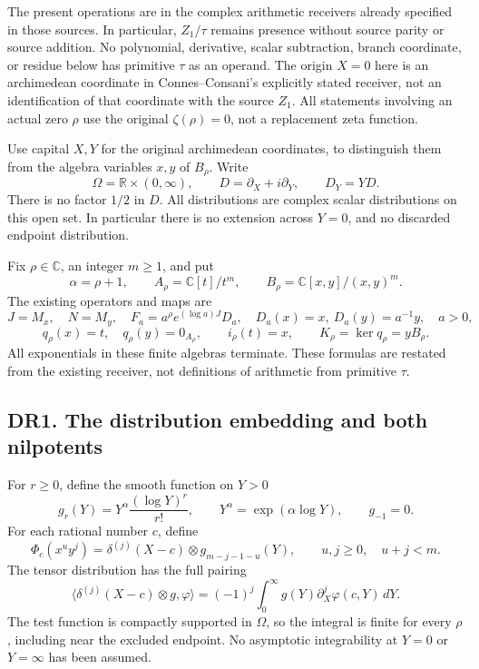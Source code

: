 The present operations are in the complex arithmetic receivers already
specified in those sources. In particular, \(Z_1/\tau\) remains presence
without source parity or source addition. No polynomial, derivative,
scalar subtraction, branch coordinate, or residue below has primitive
\(\tau\) as an operand. The origin \(X=0\) here is an archimedean
coordinate in Connes--Consani's explicitly stated receiver, not an
identification of that coordinate with the source \(Z_1\). All
statements involving an actual zero \(\rho\) use the original
\(\zeta(\rho)=0\), not a replacement zeta function.

Use capital \(X,Y\) for the original archimedean coordinates, to
distinguish them from the algebra variables \(x,y\) of \(B_\rho\). Write
\[
 \Omega=\mathbb R\times(0,\infty),\qquad
 D=\partial_X+i\partial_Y,\qquad D_Y=YD.
\tag{DR0.1}
\] There is no factor \(1/2\) in \(D\). All distributions are complex
scalar distributions on this open set. In particular there is no
extension across \(Y=0\), and no discarded endpoint distribution.

Fix \(\rho\in\mathbb C\), an integer \(m\ge1\), and put \[
 \alpha=\rho+1,\qquad
 A_\rho=\mathbb C[t]/t^m,\qquad
 B_\rho=\mathbb C[x,y]/(x,y)^m.
\tag{DR0.2}
\] The existing operators and maps are \[
 J=M_x,\quad N=M_y,\quad
 F_a=a^\rho e^{(\log a)J}D_a,\quad
 D_a(x)=x,\ D_a(y)=a^{-1}y,\quad a>0,
\tag{DR0.3}
\] \[
 q_\rho(x)=t,\quad q_\rho(y)=0_{A_\rho},\qquad
 i_\rho(t)=x,\qquad
 K_\rho=\ker q_\rho=yB_\rho.
\tag{DR0.4}
\] All exponentials in these finite algebras terminate. These formulas
are restated from the existing receiver, not definitions of arithmetic
from primitive \(\tau\).

\subsection{DR1. The distribution embedding and both
nilpotents}\label{dr1.-the-distribution-embedding-and-both-nilpotents}

For \(r\ge0\), define the smooth function on \(Y>0\) \[
 g_r(Y)=Y^\alpha\frac{(\log Y)^r}{r!},
 \qquad Y^\alpha=\exp(\alpha\log Y),
 \qquad g_{-1}=0.
\tag{DR1.1}
\] For each rational number \(c\), define \[
 \boxed{\Phi_c(x^u y^j)
   =\delta^{(j)}(X-c)\otimes g_{m-j-1-u}(Y),
       \qquad u,j\ge0,\quad u+j<m.}
\tag{DR1.2}
\] The tensor distribution has the full pairing \[
 \langle\delta^{(j)}(X-c)\otimes g,\varphi\rangle
   =(-1)^j\int_0^\infty
       g(Y)\partial_X^j\varphi(c,Y)\,dY.
\tag{DR1.3}
\] The test function is compactly supported in \(\Omega\), so the
integral is finite for every \(\rho\), including near the excluded
endpoint. No asymptotic integrability at \(Y=0\) or \(Y=\infty\) has
been assumed.

